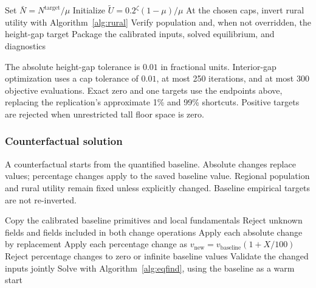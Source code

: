 \documentclass[11pt,a4paper]{article}
\newcommand{\Utilde}{\widetilde U}
\newcommand{\Nbar}{\bar N}
\begin{document}
\begin{algorithm2e}[H]
\caption{Quantify at a given cost level: \texttt{QUANTIFY\_CITY}}\label{alg:quantify}
Set $\Nbar=N^{\mathrm{target}}/\mu$\;
Initialize $\Utilde=0.2^\zeta(1-\mu)/\mu$\;
At the chosen caps, invert rural utility with Algorithm~\ref{alg:rural}\;
Verify population and, when not overridden, the height-gap target\;
Package the calibrated inputs, solved equilibrium, and diagnostics\;
\end{algorithm2e}


The absolute height-gap tolerance is $0.01$ in fractional units. Interior-gap optimization uses a cap tolerance of $0.01$, at most 250 iterations, and at most 300 objective evaluations. Exact zero and one targets use the endpoints above, replacing the replication's approximate 1\% and 99\% shortcuts. Positive targets are rejected when unrestricted tall floor space is zero.

\subsubsection{Counterfactual solution}
A counterfactual starts from the quantified baseline. Absolute changes replace values; percentage changes apply to the saved baseline value. Regional population and rural utility remain fixed unless explicitly changed. Baseline empirical targets are not re-inverted.

\begin{algorithm2e}[H]
\caption{Change primitives and solve: \texttt{APPLY\_CHANGES}, \texttt{COUNTERFACTUAL}}\label{alg:cf}
Copy the calibrated baseline primitives and local fundamentals\;
Reject unknown fields and fields included in both change operations\;
Apply each absolute change by replacement\;
Apply each percentage change as $v_{\mathrm{new}}=v_{\mathrm{baseline}}(1+X/100)$\;
Reject percentage changes to zero or infinite baseline values\;
Validate the changed inputs jointly\;
Solve with Algorithm~\ref{alg:eqfind}, using the baseline as a warm start\;
\end{algorithm2e}
\end{document}

